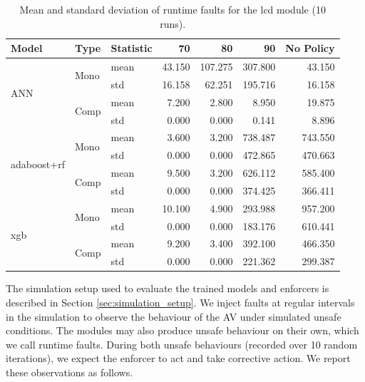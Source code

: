 \begin{table}[htbp]
   \centering
   \caption{Mean and standard deviation of runtime faults for the \gls{lcd} module (10 runs).}
   \label{tab:sim_lcd}
   \begin{tabular}{lllrrrr}
   \toprule
   \textbf{Model} & \textbf{Type}     & \textbf{Statistic} & \textbf{70}   & \textbf{80}   & \textbf{90}    & \textbf{No Policy} \\ 
   \midrule
   \multirow{4}{*}{ANN} 
     & \multirow{2}{*}{Mono} & mean &  43.150 & 107.275 & 307.800 &  43.150 \\
     &                       & std  &  16.158 &  62.251 & 195.716 &  16.158 \\ 
     & \multirow{2}{*}{Comp} & mean &   7.200 &   2.800 &   8.950 &  19.875 \\
     &                       & std  &   0.000 &   0.000 &   0.141 &   8.896 \\ 
   \midrule
   \multirow{4}{*}{\gls{adaboost}+\gls{rf}} 
     & \multirow{2}{*}{Mono} & mean &   3.600 &   3.200 & 738.487 & 743.550 \\
     &                       & std  &   0.000 &   0.000 & 472.865 & 470.663 \\ 
     & \multirow{2}{*}{Comp} & mean &   9.500 &   3.200 & 626.112 & 585.400 \\
     &                       & std  &   0.000 &   0.000 & 374.425 & 366.411 \\ 
   \midrule
   \multirow{4}{*}{\gls{xgb}} 
     & \multirow{2}{*}{Mono} & mean &  10.100 &   4.900 & 293.988 & 957.200 \\
     &                       & std  &   0.000 &   0.000 & 183.176 & 610.441 \\ 
     & \multirow{2}{*}{Comp} & mean &   9.200 &   3.400 & 392.100 & 466.350 \\
     &                       & std  &   0.000 &   0.000 & 221.362 & 299.387 \\ 
   \bottomrule
   \end{tabular}
   \end{table}
   

The simulation setup used to evaluate the trained models and enforcers is described in Section \ref{sec:simulation_setup}. We inject faults at regular intervals in the simulation to observe the behaviour of the AV under simulated unsafe conditions. The modules may also produce unsafe behaviour on their own, which we call runtime faults. During both unsafe behaviours (recorded over 10 random iterations), we expect the enforcer to act and take corrective action. We report these observations as follows.

